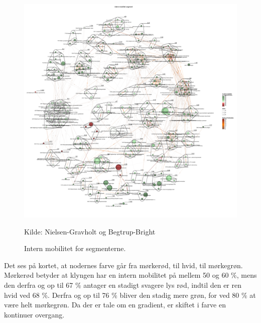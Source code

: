 \begin{figure}[H]
\begin{center}
	\caption{Intern mobilitet for segmenterne.}
	\label{fig_analyse_deskriptivt_kort_intern_mob_seg}
	\includegraphics[width=1.0\textwidth]{fig/netvaerkskort/kort_intern_mob_seg.pdf}
	\centerline{ \tiny{Kilde: Nielsen-Gravholt og Begtrup-Bright}}
\end{center}
\end{figure}
\restoregeometry

Det ses på kortet, at nodernes farve går fra mørkerød, til hvid, til mørkegrøn. Mørkerød betyder at klyngen har en intern mobilitet på mellem 50 og 60 \%, mens den derfra og op til 67 \% antager en stadigt svagere lys rød, indtil den er ren hvid ved 68 \%. Derfra og op til 76 \% bliver den stadig mere grøn, for ved 80 \% at være helt mørkegrøn. Da der er tale om en gradient, er skiftet i farve en kontinuer overgang. 

